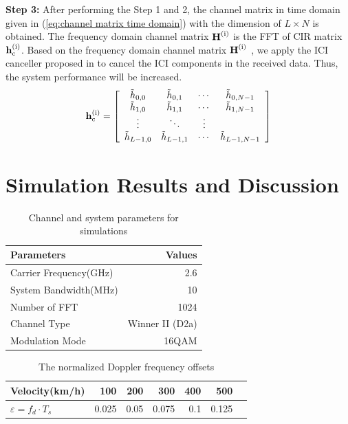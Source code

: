 \documentclass[12pt,journal,draftclsnofoot,onecolumn]{IEEEtran}
\begin{document}
{{			
\rm{\textbf {Step 3:} After performing the Step 1 and 2, the channel matrix in time domain given in (\ref{eq:channel matrix time domain}) with the dimension of $L \times N$ is obtained. The frequency domain channel matrix $\rm{\textbf H^{(i)}}$ is the FFT of CIR matrix  $\rm{\textbf h^{(i)}_{c}}$. Based on the frequency domain channel matrix $\rm{\textbf H^{(i)}}$ , we apply the ICI canceller proposed in \cite{Qiu2010} to cancel the ICI components in the received data. Thus, the system performance will be increased.
%
\begin{equation}\label{eq:channel matrix time domain}
	{
		\rm{\textbf h^{(i)}_{c}}=\left[\begin{array}{cccc}
		{\tilde{h}_{0,0}}& \tilde{h}_{0,1} &  \cdots &  \tilde{h}_{0,N-1} \\
		\tilde{h}_{1,0}&  \tilde{h}_{1,1}&  \cdots &  \tilde{h}_{1,N-1} \\
			\vdots &  \ddots&  \vdots \\
		\tilde{h}_{L-1,0}&  \tilde{h}_{L-1,1}&  \cdots &  \tilde{h}_{L-1,N-1}
		\end{array}\right]}
\end{equation}
%
				
\section{Simulation Results and Discussion}\label{section-4}
	\begin{table}
		\centering
		\caption{Channel and system parameters for simulations}
		\label{ta:parameters}
					\begin{center}
						\begin{tabular}{|l|r|}
							\hline 	
							Parameters & Values\\
							\hline 
							Carrier Frequency(GHz)  &  2.6   \\
							\hline
							System Bandwidth(MHz) & 10\\
							\hline
							Number of FFT & 1024\\
							\hline
							Channel Type & Winner II (D2a)\\
							\hline
							Modulation Mode & 16QAM\\	
							\hline
							
		\end{tabular}
	\end{center}
\end{table}
				
				
\begin{table}
		\centering
		\caption{The normalized Doppler frequency offsets}
		\label{ta:Normalize-frequency-offset}
		\begin{center}
			\begin{tabular}{|l|r|r|r|r|r|r|}
				\hline 	
				Velocity(km/h) & 100 & 200 & 300 & 400 & 500  \\
				\hline 
			{$\varepsilon=f_{d} \cdot T_{s} $} & 0.025 &0.05 & 0.075 & 0.1 & 0.125 \\
				\hline 
			\end{tabular}
		\end{center}
\end{table}
				
}}}
\end{document}

